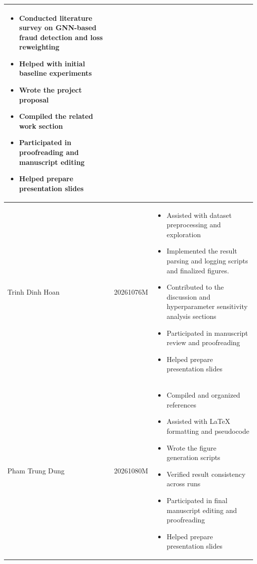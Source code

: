 \begin{table}[h]
\begin{tabular}{llp{6.5cm}}
\begin{itemize}[leftmargin=*,nosep]
                           \item Conducted literature survey on GNN-based fraud detection and loss reweighting
                           \item Helped with initial baseline experiments
                           \item Wrote the project proposal
                           \item Compiled the related work section
                           \item Participated in proofreading and manuscript editing
                           \item Helped prepare presentation slides
                         \end{itemize} \\
\midrule
Trinh Dinh Hoan  & 20261076M & \begin{itemize}[leftmargin=*,nosep]
                           \item Assisted with dataset preprocessing and exploration
                           \item Implemented the result parsing and logging scripts and finalized figures.
                           \item Contributed to the discussion and hyperparameter sensitivity analysis sections
                           \item Participated in manuscript review and proofreading
                           \item Helped prepare presentation slides
                         \end{itemize} \\
\midrule
Pham Trung Dung   & 20261080M & \begin{itemize}[leftmargin=*,nosep]
                           \item Compiled and organized references
                           \item Assisted with LaTeX formatting and pseudocode
                           \item Wrote the figure generation scripts
                           \item Verified result consistency across runs
                           \item Participated in final manuscript editing and proofreading
                           \item Helped prepare presentation slides
                         \end{itemize} \\
\bottomrule
\end{tabular}
\end{table}

